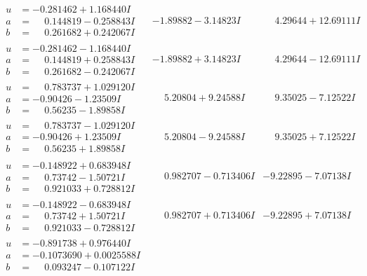 \documentclass[1p]{elsarticle_modified}
\theoremstyle{definition}
\begin{document}
$$\begin{array}{c|c|c}
\begin{aligned}
u &= -0.281462 + 1.168440 I \\
a &= \phantom{-}0.144819 - 0.258843 I \\
b &= \phantom{-}0.261682 + 0.242067 I\end{aligned}
 & -1.89882 - 3.14823 I & \phantom{-}4.29644 + 12.69111 I \\ \hline\begin{aligned}
u &= -0.281462 - 1.168440 I \\
a &= \phantom{-}0.144819 + 0.258843 I \\
b &= \phantom{-}0.261682 - 0.242067 I\end{aligned}
 & -1.89882 + 3.14823 I & \phantom{-}4.29644 - 12.69111 I \\ \hline\begin{aligned}
u &= \phantom{-}0.783737 + 1.029120 I \\
a &= -0.90426 - 1.23509 I \\
b &= \phantom{-}0.56235 - 1.89858 I\end{aligned}
 & \phantom{-}5.20804 + 9.24588 I & \phantom{-}9.35025 - 7.12522 I \\ \hline\begin{aligned}
u &= \phantom{-}0.783737 - 1.029120 I \\
a &= -0.90426 + 1.23509 I \\
b &= \phantom{-}0.56235 + 1.89858 I\end{aligned}
 & \phantom{-}5.20804 - 9.24588 I & \phantom{-}9.35025 + 7.12522 I \\ \hline\begin{aligned}
u &= -0.148922 + 0.683948 I \\
a &= \phantom{-}0.73742 - 1.50721 I \\
b &= \phantom{-}0.921033 + 0.728812 I\end{aligned}
 & \phantom{-}0.982707 - 0.713406 I & -9.22895 - 7.07138 I \\ \hline\begin{aligned}
u &= -0.148922 - 0.683948 I \\
a &= \phantom{-}0.73742 + 1.50721 I \\
b &= \phantom{-}0.921033 - 0.728812 I\end{aligned}
 & \phantom{-}0.982707 + 0.713406 I & -9.22895 + 7.07138 I \\ \hline\begin{aligned}
u &= -0.891738 + 0.976440 I \\
a &= -0.1073690 + 0.0025588 I \\
b &= \phantom{-}0.093247 - 0.107122 I\end{aligned}

\end{array}$$
\end{document}
